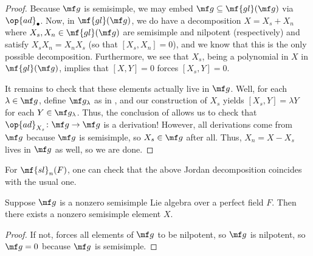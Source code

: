 \documentclass[../notes.tex]{subfiles}
\begin{document}
\begin{proof}
	Because $\mf g$ is semisimple, we may embed $\mf g\subseteq\mf{gl}(\mf g)$ via $\op{ad}_\bullet$. Now, in $\mf{gl}(\mf g)$, we do have a decomposition $X=X_s+X_n$ where $X_s,X_n\in\mf{gl}(\mf g)$ are semisimple and nilpotent (respectively) and satisfy $X_sX_n=X_nX_s$ (so that $[X_s,X_n]=0$), and we know that this is the only possible decomposition. Furthermore, we see that $X_s$, being a polynomial in $X$ in $\mf{gl}(\mf g)$, implies that $[X,Y]=0$ forces $[X_s,Y]=0$.
	
	It remains to check that these elements actually live in $\mf g$. Well, for each $\lambda\in\mf g$, define $\mf g_\lambda$ as in , and our construction of $X_s$ yields $[X_s,Y]=\lambda Y$ for each $Y\in\mf g_\lambda$. Thus, the conclusion of  allows us to check that $\op{ad}_{X_s}\colon\mf g\to\mf g$ is a derivation! However, all derivations come from $\mf g$ because $\mf g$ is semisimple, so $X_s\in\mf g$ after all. Thus, $X_n=X-X_s$ lives in $\mf g$ as well, so we are done.
\end{proof}
\begin{remark}
	For $\mf{sl}_n(F)$, one can check that the above Jordan decomposition coincides with the usual one.
\end{remark}
\begin{corollary}
	Suppose $\mf g$ is a nonzero semisimple Lie algebra over a perfect field $F$. Then there exists a nonzero semisimple element $X$.
\end{corollary}
\begin{proof}
	If not,  forces all elements of $\mf g$ to be nilpotent, so $\mf g$ is nilpotent, so $\mf g=0$ because $\mf g$ is semisimple.
\end{proof}
\end{document}

